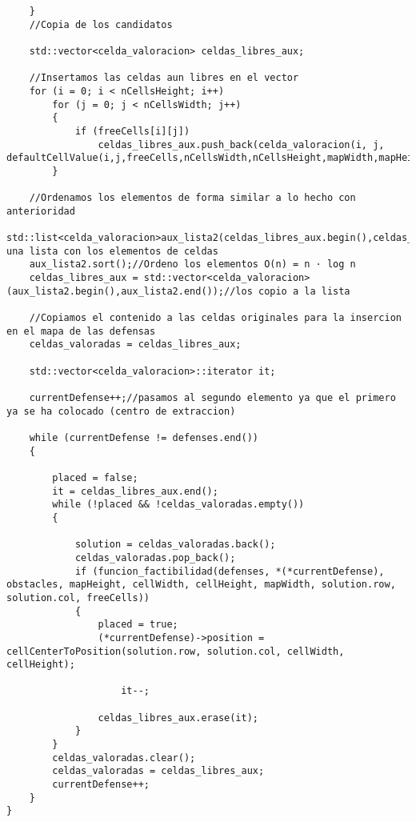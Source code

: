 \begin{lstlisting}
    }
    //Copia de los candidatos

    std::vector<celda_valoracion> celdas_libres_aux;

    //Insertamos las celdas aun libres en el vector 
    for (i = 0; i < nCellsHeight; i++)
        for (j = 0; j < nCellsWidth; j++)
        {
            if (freeCells[i][j])
                celdas_libres_aux.push_back(celda_valoracion(i, j, defaultCellValue(i,j,freeCells,nCellsWidth,nCellsHeight,mapWidth,mapHeight,obstacles,defenses)));
        }

    //Ordenamos los elementos de forma similar a lo hecho con anterioridad
    std::list<celda_valoracion>aux_lista2(celdas_libres_aux.begin(),celdas_libres_aux.end());//Creo una lista con los elementos de celdas
    aux_lista2.sort();//Ordeno los elementos O(n) = n · log n
    celdas_libres_aux = std::vector<celda_valoracion>(aux_lista2.begin(),aux_lista2.end());//los copio a la lista

    //Copiamos el contenido a las celdas originales para la insercion en el mapa de las defensas
    celdas_valoradas = celdas_libres_aux;

    std::vector<celda_valoracion>::iterator it;
    
    currentDefense++;//pasamos al segundo elemento ya que el primero ya se ha colocado (centro de extraccion)

    while (currentDefense != defenses.end())
    {
        
        placed = false;
        it = celdas_libres_aux.end();
        while (!placed && !celdas_valoradas.empty())
        {
            
            solution = celdas_valoradas.back();
            celdas_valoradas.pop_back();
            if (funcion_factibilidad(defenses, *(*currentDefense), obstacles, mapHeight, cellWidth, cellHeight, mapWidth, solution.row, solution.col, freeCells))
            {
                placed = true;
                (*currentDefense)->position = cellCenterToPosition(solution.row, solution.col, cellWidth, cellHeight);
                
                    it--;
                
                celdas_libres_aux.erase(it);
            }
        }
        celdas_valoradas.clear();
        celdas_valoradas = celdas_libres_aux;
        currentDefense++;
    }
}
\end{lstlisting}